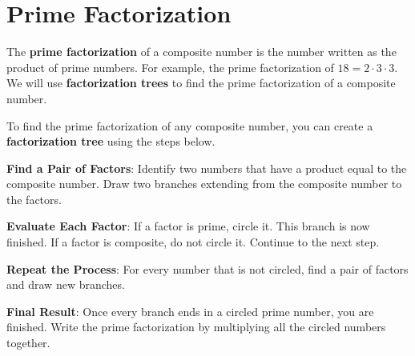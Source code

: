 \documentclass{ximera}[font=12pt]  %
\begin{document}
\section*{Prime Factorization}

The \textbf{prime factorization} of a composite number is the number written as the
product of prime numbers.  For example, the prime factorization of $18 =  2 \cdot 3 \cdot 3.$
We will use \textbf{factorization trees} to find the prime factorization of a composite number.

\begin{procedure}

To find the prime factorization of any composite number, you can create a \textbf{factorization tree} using the steps below.

\begin{description}[style=multiline, leftmargin=5em, font=\bfseries]

\item[Step 1] \textbf{Find a Pair of Factors}: Identify two numbers that have a product equal to the composite number.  
Draw two branches extending from the composite number to the factors.

\item[Step 2] \textbf{Evaluate Each Factor}: If a factor is prime, circle it. This branch is now finished.  If a factor is 
composite, do not circle it. Continue to the next step.

\item[Step 3] \textbf{Repeat the Process}: For every number that is not circled, find a pair of factors and draw new branches.


\item[Step 4] \textbf{Final Result}: Once every branch ends in a circled prime number, you are finished.  Write the prime factorization by multiplying all the circled numbers together.

\end{description}

\end{procedure}
\end{document}
